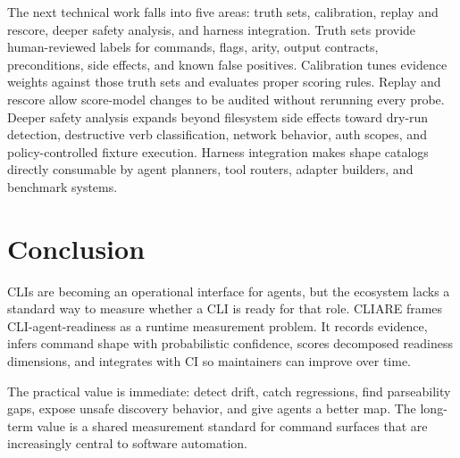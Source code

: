 \documentclass[11pt]{article}
\begin{document}
The next technical work falls into five areas: truth sets, calibration, replay and rescore, deeper safety analysis, and harness integration. Truth sets provide human-reviewed labels for commands, flags, arity, output contracts, preconditions, side effects, and known false positives. Calibration tunes evidence weights against those truth sets and evaluates proper scoring rules. Replay and rescore allow score-model changes to be audited without rerunning every probe. Deeper safety analysis expands beyond filesystem side effects toward dry-run detection, destructive verb classification, network behavior, auth scopes, and policy-controlled fixture execution. Harness integration makes shape catalogs directly consumable by agent planners, tool routers, adapter builders, and benchmark systems.

\section{Conclusion}

CLIs are becoming an operational interface for agents, but the ecosystem lacks a standard way to measure whether a CLI is ready for that role. CLIARE frames CLI-agent-readiness as a runtime measurement problem. It records evidence, infers command shape with probabilistic confidence, scores decomposed readiness dimensions, and integrates with CI so maintainers can improve over time.

The practical value is immediate: detect drift, catch regressions, find parseability gaps, expose unsafe discovery behavior, and give agents a better map. The long-term value is a shared measurement standard for command surfaces that are increasingly central to software automation.
\end{document}
